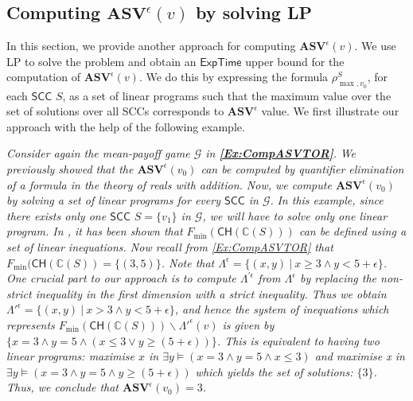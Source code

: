 \subsection{Computing $\mathbf{ASV}^{\epsilon}(v)$ by solving LP}
In this section, we provide another approach for computing $\mathbf{ASV}^{\epsilon}(v)$.
We use LP to solve the problem and obtain an $\mathsf{ExpTime}$ upper bound for the computation of $\mathbf{ASV}^{\epsilon}(v)$.
We do this by expressing the formula $\rho^S_{\max,v_0}$, for each $\mathsf{SCC}$ $S$, as a set of linear programs such that the maximum value over the set of solutions over all {\sf SCC}s corresponds to $\mathbf{ASV}^{\epsilon}$ value. 
We first illustrate our approach with the help of the following example.
\begin{example}
\label{Ex:CompASVLP}
\emph{Consider again
the mean-payoff game $\mathcal{G}$ in \textbf{\cref{Ex:CompASVTOR}}.}
\emph{We previously showed that the $\mathbf{ASV}^{\epsilon}(v_0)$ can be computed by quantifier elimination of a formula in the theory of reals with addition. Now, we compute $\mathbf{ASV}^{\epsilon}(v_0)$ by solving a set of linear programs for every $\mathsf{SCC}$ in $\mathcal{G}$.}
\emph{In this example, since there exists only one $\mathsf{SCC}$ $S = \{v_1\}$ in $\mathcal{G}$, we will have to solve only one linear program. 
In \cite{CDEHR10}, it has been shown that $F_{\min}(\mathsf{CH}(\mathbb{C}(S)))$ can be defined using a set of linear inequations.
Now recall from \cref{Ex:CompASVTOR} that $F_{\min}(\mathsf{CH}(\mathbb{C}(S))=\{(3,5)\}$.
Note that $\Lambda^{\epsilon} = \{(x,y) \:|\: x \geqslant 3 \land y < 5 + \epsilon \}$.
One crucial part to our approach is to compute $\Lambda^{'\epsilon}$ from $\Lambda^{\epsilon}$ by replacing the non-strict inequality in the first dimension with a strict inequality.
Thus we obtain $\Lambda'^{\epsilon} = \{(x,y) \:|\: x > 3 \land y < 5 + \epsilon \}$, and hence the system of inequations which represents $F_{\min}(\mathsf{CH}(\mathbb{C}(S))) \backslash \Lambda'^{\epsilon}(v)$ is given by $\{ x = 3 \land y = 5 \land (x \leqslant 3 \lor y \geqslant (5 + \epsilon)) \}$. 
This is equivalent to having two linear programs: \textit{maximise $x$ in $\exists y \models (x = 3 \land y = 5 \land x \leqslant 3)$} and \textit{maximise x in $\exists y \models (x = 3 \land y = 5 \land y \geqslant (5 + \epsilon))$} which yields the set of solutions: $\{3\}$. Thus, we conclude that $\mathbf{ASV}^{\epsilon}(v_0) = 3$.}
\end{example}

